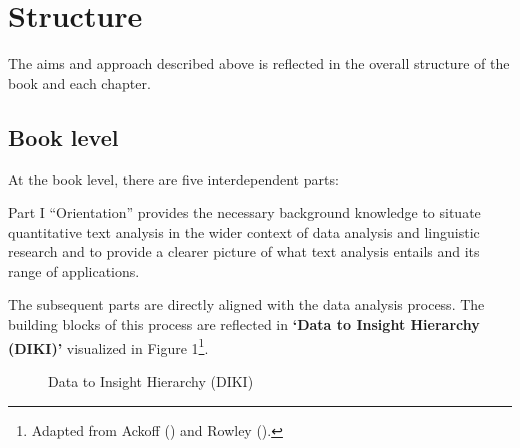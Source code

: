 \documentclass[
  letterpaper,
]{latex/krantz}
\theoremstyle{definition}
\theoremstyle{remark}
\begin{document}
\section*{Structure}\label{sec-p-structure}


The aims and approach described above is reflected in the overall
structure of the book and each chapter.

\subsection*{Book level}\label{sec-p-structure-book}

At the book level, there are five interdependent parts:

Part I ``Orientation'' provides the necessary background knowledge to
situate quantitative text analysis in the wider context of data analysis
and linguistic research and to provide a clearer picture of what text
analysis entails and its range of applications.

The subsequent parts are directly aligned with the data analysis
process. The building blocks of this process are reflected in
\textbf{`Data to Insight Hierarchy
(DIKI)'} visualized in Figure 1\footnote{Adapted from Ackoff
  () and Rowley
  ().}.

\begin{figure}[H]


\caption{\label{fig-diki-hierarchy}Data to Insight Hierarchy (DIKI)}

\end{figure}%
\end{document}
